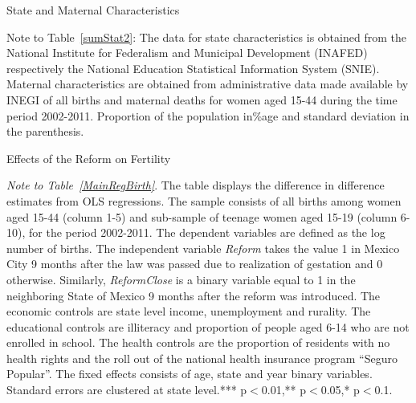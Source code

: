 \documentclass[a4paper, 11pt]{article}
\begin{document}
\begin{spacing}{2}
\begin{table}[H]\caption{State and Maternal Characteristics}\label{sumStat2}
\begin{threeparttable}

\begin{tablenotes}
\item Note to Table~\ref{sumStat2}:	The data for state characteristics is obtained from the National Institute for Federalism and Municipal Development (INAFED) respectively the National Education Statistical Information System (SNIE). Maternal characteristics are obtained from administrative data made available by INEGI of all births and maternal deaths for women aged 15-44 during the time period 2002-2011. Proportion of the population in\%age and standard deviation in the parenthesis.
\end{tablenotes}
\end{threeparttable}
\end{table}



\begin{table}\caption{Effects of the Reform on Fertility} \label{MainRegBirth}
\begin{threeparttable}
 {\footnotesize  }
\begin{tablenotes}
\footnotesize
\item \textit{Note to Table~\ref{MainRegBirth}}. The table displays the difference in difference estimates from OLS regressions. The sample consists of all births among women aged 15-44 (column 1-5) and sub-sample of teenage women aged 15-19 (column 6-10), for the period 2002-2011. The dependent variables are defined as the log number of births. The independent variable \textit{Reform} takes the value 1 in Mexico City 9 months after the law was passed due to realization of gestation and 0 otherwise. Similarly, \textit{ReformClose} is a binary variable equal to 1 in the neighboring State of Mexico 9 months after the reform was introduced. The economic controls are state level income, unemployment and rurality. The educational controls are illiteracy and proportion of people aged 6-14 who are not enrolled in school. The health controls are the proportion of residents with no health rights and the roll out of the national health insurance program ``Seguro Popular''. The fixed effects consists of age, state and year binary variables. Standard errors are clustered at state level.*** p$<$0.01,** p$<$0.05,* p$<$0.1.
\end{tablenotes} 
\end{threeparttable}
\end{table}


\end{spacing}
\end{document}
